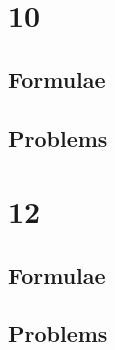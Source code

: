 \documentclass[journal]{IEEEtran}
\begin{document}
\newpage


\tableofcontents

\newpage
\onecolumn


\renewcommand{\thetable}{\theenumi}

\renewcommand{\theHequation}{\thesection.\thesubsection.\arabic{enumi}.\arabic{equation}}
\renewcommand{\theHfigure}{\thesection.\thesubsection.\arabic{enumi}.\arabic{figure}}
\renewcommand{\theHtable}{\thesection.\thesubsection.\arabic{enumi}.\arabic{table}}

\section{10}
\subsection{Formulae}

\subsection{Problems}


\section{12}
\subsection{Formulae}

\subsection{Problems}

\end{document}
